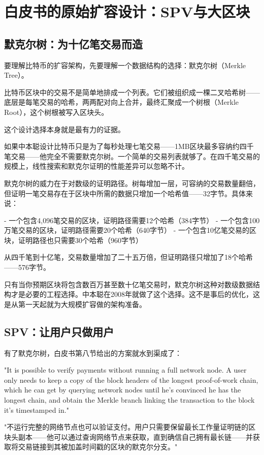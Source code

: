 \documentclass[a4paper,12pt,openany]{ctexbook}
\newenvironment{quoting}{%
  \par\vspace{0.5em}%
  \begin{list}{}{%
    \setlength{\leftmargin}{2em}%
    \setlength{\rightmargin}{2em}%
    \setlength{\parsep}{0.3em}%
    \setlength{\itemsep}{0pt}%
    \setlength{\topsep}{0pt}%
  }%
  \item\relax
}{%
  \end{list}%
  \par\vspace{0.5em}%
}
\begin{document}
\section*{白皮书的原始扩容设计：SPV与大区块}



\subsection*{默克尔树：为十亿笔交易而造}


要理解比特币的扩容架构，先要理解一个数据结构的选择：默克尔树（Merkle Tree）。

比特币区块中的交易不是简单地排成一个列表。它们被组织成一棵二叉哈希树——底层是每笔交易的哈希，两两配对向上合并，最终汇聚成一个树根（Merkle Root），这个树根被写入区块头。

这个设计选择本身就是最有力的证据。

如果中本聪设计比特币只是为了每秒处理七笔交易——1MB区块最多容纳约四千笔交易——他完全不需要默克尔树。一个简单的交易列表就够了。在四千笔交易的规模上，线性搜索和默克尔证明的性能差异可以忽略不计。

默克尔树的威力在于对数级的证明路径。树每增加一层，可容纳的交易数量翻倍，但证明一笔交易存在于区块中所需的数据只增加一个哈希值——32字节。具体来说：

- 一个包含4,096笔交易的区块，证明路径需要12个哈希（384字节）
- 一个包含100万笔交易的区块，证明路径需要20个哈希（640字节）
- 一个包含10亿笔交易的区块，证明路径也只需要30个哈希（960字节）

从四千笔到十亿笔，交易数量增加了二十五万倍，但证明路径只增加了18个哈希——576字节。

只有当你预期区块将包含数百万甚至数十亿笔交易时，默克尔树这种对数级数据结构才是必要的工程选择。中本聪在2008年就做了这个选择。这不是事后的优化，这是从第一天起就为大规模扩容做的架构准备。


\subsection*{SPV：让用户只做用户}


有了默克尔树，白皮书第八节给出的方案就水到渠成了：


\begin{quoting}
\small
"It is possible to verify payments without running a full network node. A user only needs to keep a copy of the block headers of the longest proof-of-work chain, which he can get by querying network nodes until he's convinced he has the longest chain, and obtain the Merkle branch linking the transaction to the block it's timestamped in."

"不运行完整的网络节点也可以验证支付。用户只需要保留最长工作量证明链的区块头副本——他可以通过查询网络节点来获取，直到确信自己拥有最长链——并获取将交易链接到其被加盖时间戳的区块的默克尔分支。"
\end{quoting}
\end{document}
